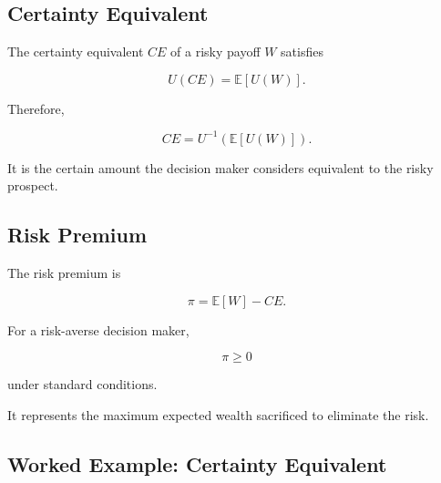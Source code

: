 \subsection{Certainty Equivalent}
\label{subsec:certainty-equivalent}

The certainty equivalent \(CE\) of a risky payoff \(W\) satisfies

\[
\boxed{
U(CE)
=
\mathbb{E}
[
U(W)
].
}
\]

Therefore,

\[
\boxed{
CE
=
U^{-1}
\left(
\mathbb{E}[U(W)]
\right).
}
\]

It is the certain amount the decision maker considers equivalent to the
risky prospect.

\subsection{Risk Premium}
\label{subsec:risk-premium}

The risk premium is

\[
\boxed{
\pi
=
\mathbb{E}[W]
-
CE.
}
\]

For a risk-averse decision maker,

\[
\boxed{
\pi\geq0
}
\]

under standard conditions.

It represents the maximum expected wealth sacrificed to eliminate the
risk.

\subsection{Worked Example: Certainty Equivalent}
\label{subsec:worked-certainty-equivalent}

